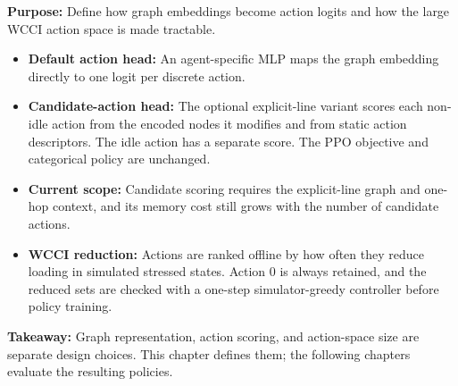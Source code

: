 \begin{tcolorbox}[
  colframe=red!75!black,
  colback=red!5!white,
  title=Chapter Summary (3/3): Action Scoring and Large-Grid Reduction
]
\textbf{Purpose:} Define how graph embeddings become action logits and how the
large WCCI action space is made tractable.

\begin{itemize}
  \item \textbf{Default action head:} An agent-specific MLP maps the graph
  embedding directly to one logit per discrete action.
  \item \textbf{Candidate-action head:} The optional explicit-line variant
  scores each non-idle action from the encoded nodes it modifies and from static
  action descriptors. The idle action has a separate score. The PPO objective
  and categorical policy are unchanged.
  \item \textbf{Current scope:} Candidate scoring requires the explicit-line
  graph and one-hop context, and its memory cost still grows with the number of
  candidate actions.
  \item \textbf{WCCI reduction:} Actions are ranked offline by how often they
  reduce loading in simulated stressed states. Action 0 is always retained, and
  the reduced sets are checked with a one-step simulator-greedy controller
  before policy training.
\end{itemize}

\textbf{Takeaway:} Graph representation, action scoring, and action-space size
are separate design choices. This chapter defines them; the following chapters
evaluate the resulting policies.
\end{tcolorbox}
